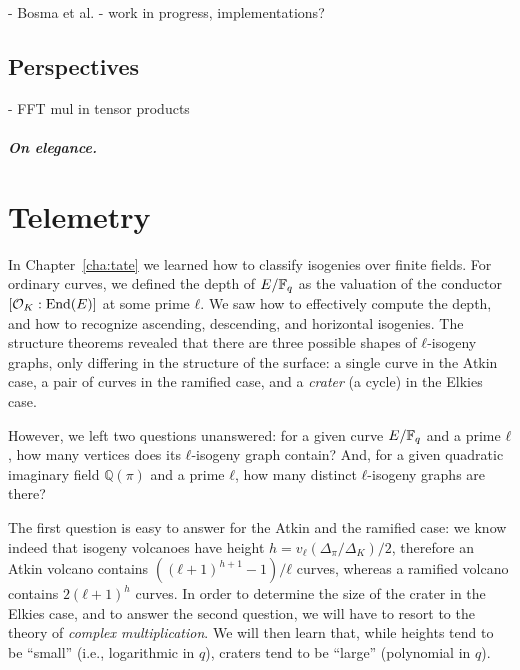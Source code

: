 \documentclass{report}
\theoremstyle{plain}
\theoremstyle{definition}
\begin{document}
- Bosma et al.
- work in progress, implementations?



\section{Perspectives}

- FFT mul in tensor products

\paragraph{On elegance.}




\chapter{Telemetry}
\label{cha:crypto}

In Chapter~\ref{cha:tate} we learned how to classify isogenies over
finite fields. %
For ordinary curves, we defined the depth of $E/\mathbb{F}_q$ as the valuation
of the conductor $[\mathcal{O}_K:\operatorname{End}(E)]$ at some prime $ℓ$. %
We saw how to effectively compute the depth, and how to recognize
ascending, descending, and horizontal isogenies. %
The structure theorems revealed that there are three possible shapes
of $ℓ$-isogeny graphs, only differing in the structure of the surface:
a single curve in the Atkin case, a pair of curves in the ramified
case, and a \emph{crater} (a cycle) in the Elkies case. %

However, we left two questions unanswered: for a given curve $E/\mathbb{F}_q$
and a prime $ℓ$, how many vertices does its $ℓ$-isogeny graph
contain? %
And, for a given quadratic imaginary field $ℚ(π)$ and a prime $ℓ$, how
many distinct $ℓ$-isogeny graphs are there?

The first question is easy to answer for the Atkin and the ramified
case: we know indeed that isogeny volcanoes have height
$h=v_ℓ(Δ_π/Δ_K)/2$, therefore an Atkin volcano contains
$((ℓ+1)^{h+1}-1)/ℓ$ curves, whereas a ramified volcano contains
$2(ℓ+1)^h$ curves. %
In order to determine the size of the crater in the Elkies case, and
to answer the second question, we will have to resort to the theory of
\emph{complex multiplication}. %
We will then learn that, while heights tend to be ``small'' (i.e.,
logarithmic in $q$), craters tend to be ``large'' (polynomial in $q$). %
\end{document}
